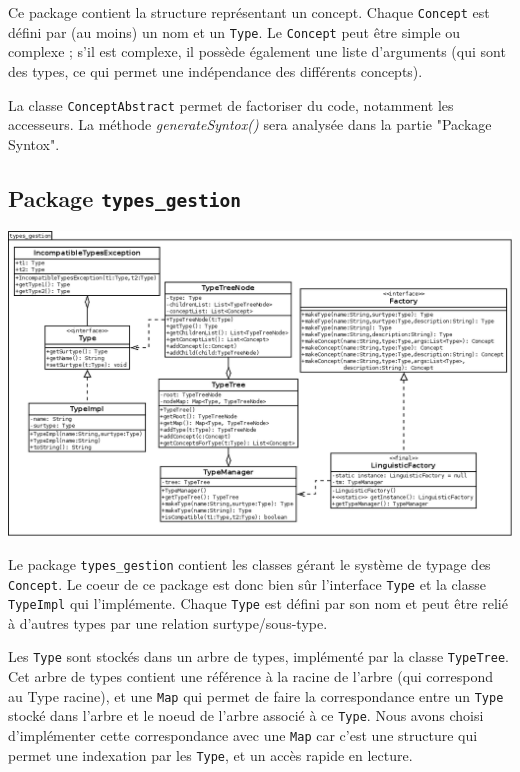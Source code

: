 \documentclass[12pt]{report}
\begin{document}
Ce package contient la structure représentant un concept. Chaque \texttt{Concept} est défini par (au moins) un nom et un \texttt{Type}. Le \texttt{Concept} peut être simple ou complexe ; s'il est complexe, il possède également une liste d'arguments (qui sont des types, ce qui permet une indépendance des différents concepts).

La classe \texttt{ConceptAbstract} permet de factoriser du code, notamment les accesseurs.
La méthode \emph{generateSyntox()} sera analysée dans la partie "Package Syntox".

\subsection{Package \texttt{types\_gestion}}

\begin{center}
\includegraphics[scale=0.43]{DiagLinguistic_types_gestion.png}
\end{center}

Le package \texttt{types\_gestion} contient les classes gérant le système de typage des \texttt{Concept}. Le coeur de ce package est donc bien sûr l'interface \texttt{Type} et la classe \texttt{TypeImpl} qui l'implémente.
Chaque \texttt{Type} est défini par son nom et peut être relié à d'autres types par une relation surtype/sous-type.

\bigskip

Les \texttt{Type} sont stockés dans un arbre de types, implémenté par la classe \texttt{TypeTree}. Cet arbre de types contient une référence à la racine de l'arbre (qui correspond au Type racine), et une \texttt{Map} qui permet de faire la correspondance entre un \texttt{Type} stocké dans l'arbre et le noeud de l'arbre associé à ce \texttt{Type}. Nous avons choisi d'implémenter cette correspondance avec une \texttt{Map} car c'est une structure qui permet une indexation par les \texttt{Type}, et un accès rapide en lecture.
\end{document}
